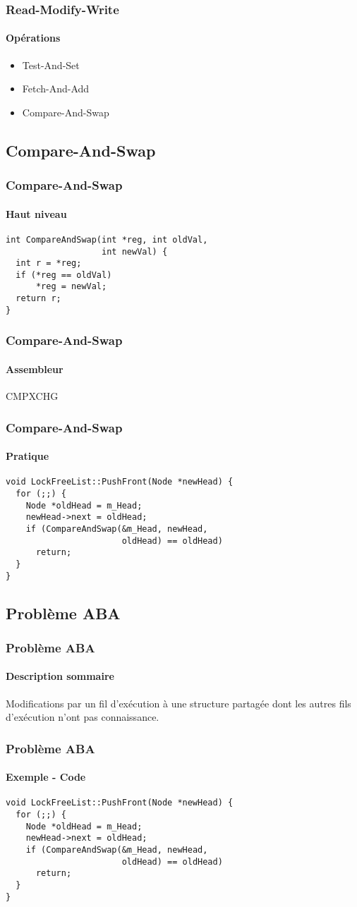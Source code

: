 \documentclass{beamer}
\begin{document}
\begin{frame}
\frametitle{Read-Modify-Write}
\framesubtitle{Opérations}
\begin{itemize}
\item Test-And-Set
\item Fetch-And-Add
\item Compare-And-Swap
\end{itemize}
\end{frame}

\subsection{Compare-And-Swap}
\begin{frame}[fragile]
\frametitle{Compare-And-Swap}
\framesubtitle{Haut niveau}
\begin{lstlisting}
int CompareAndSwap(int *reg, int oldVal,
                   int newVal) {
  int r = *reg;
  if (*reg == oldVal)
      *reg = newVal;
  return r;
}
\end{lstlisting}
\end{frame}

\begin{frame}[fragile]
\frametitle{Compare-And-Swap}
\framesubtitle{Assembleur}
\begin{center}
\Huge CMPXCHG
\end{center}
\end{frame}

\begin{frame}[fragile]
\frametitle{Compare-And-Swap}
\framesubtitle{Pratique}
\begin{lstlisting}
void LockFreeList::PushFront(Node *newHead) {
  for (;;) {
    Node *oldHead = m_Head;
    newHead->next = oldHead;
    if (CompareAndSwap(&m_Head, newHead, 
                       oldHead) == oldHead)
      return;
  }
}
\end{lstlisting}
\end{frame}

\subsection{Problème ABA}
\begin{frame}
\frametitle{Problème ABA}
\framesubtitle{Description sommaire}
Modifications par un fil d'exécution à une structure partagée dont les autres fils d'exécution n'ont pas connaissance.
\end{frame}

\begin{frame}[fragile]
\frametitle{Problème ABA}
\framesubtitle{Exemple - Code}
\begin{lstlisting}
void LockFreeList::PushFront(Node *newHead) {
  for (;;) {
    Node *oldHead = m_Head;
    newHead->next = oldHead;
    if (CompareAndSwap(&m_Head, newHead, 
                       oldHead) == oldHead)
      return;
  }
}
\end{lstlisting}
\end{frame}
\end{document}
